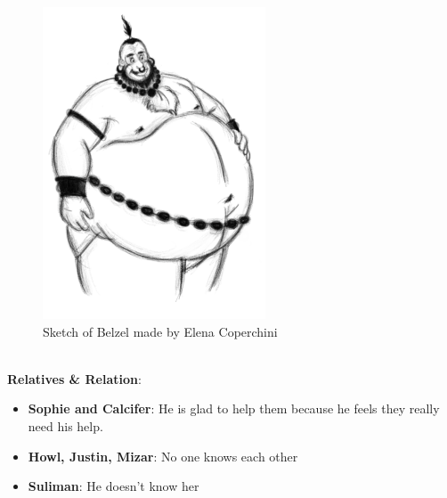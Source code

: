 \hfill\begin{minipage}{0.4\textwidth}
  \begin{figure}[H]
    \hfill\includegraphics{Images/Characters/belzel}
    \caption{Sketch of Belzel made by Elena Coperchini}
  \end{figure}
\end{minipage}



\\
\textbf{Relatives \& Relation}:
\begin{itemize}
\item \textbf{Sophie and Calcifer}: He  is glad to help them because he feels they really need his help.
\item \textbf{Howl, Justin, Mizar}: No one knows each other
\item \textbf{Suliman}: He doesn’t know her
\end{itemize}

